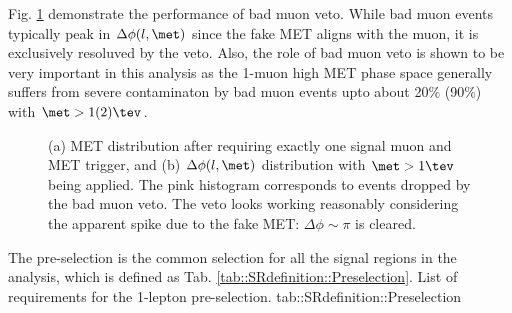 Fig. \ref{fig::SRdefinition::badMuonVeto} demonstrate the performance of bad muon veto. While bad muon events typically peak in $\Delta \phi (l,\met)$ since the fake MET aligns with the muon, it is exclusively resoluved by the veto. Also, the role of bad muon veto is shown to be very important in this analysis as the 1-muon high MET phase space generally suffers from severe contaminaton by bad muon events upto about 20$\%$ (90$\%$) with  $\met>1(2)\tev$.  \\

\begin{figure}[h]
  \centering
    \caption{(a) MET distribution after requiring exactly one signal muon and MET trigger, and (b) $\Delta \phi (l,\met)$ distribution with $\met>1\tev$ being applied. The pink histogram corresponds to events dropped by the bad muon veto. The veto looks working reasonably considering the apparent spike due to the fake MET: $\Delta \phi \sim \pi$ is cleared.}
    \label{fig::SRdefinition::badMuonVeto}
\end{figure}

The pre-selection is the common selection for all the signal regions in the analysis, which is defined as Tab. \ref{tab::SRdefinition::Preselection}.
{List of requirements for the 1-lepton pre-selection.}
{tab::SRdefinition::Preselection}

